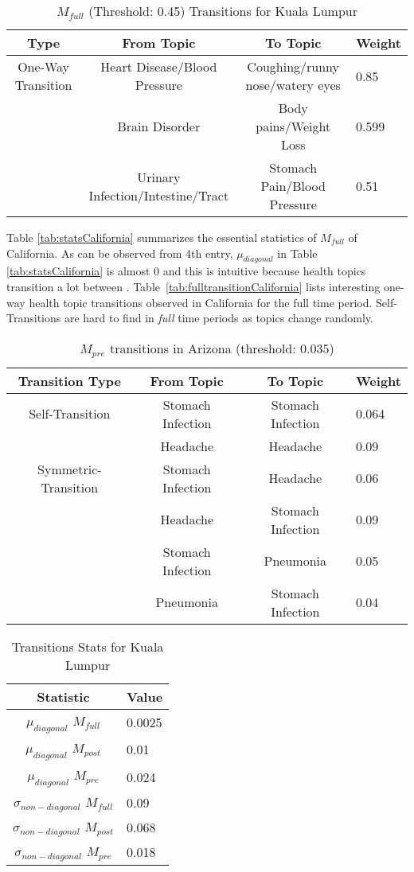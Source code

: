 \begin{table*}[t!]
\centering
\caption{$M_{full}$ (Threshold: 0.45) Transitions for Kuala Lumpur}
\label{tab:transitionKualaLumpur}
\begin{tabular}{|c|c|c|l|} \hline
Type &From Topic&To Topic&Weight\\ \hline
One-Way Transition& Heart Disease/Blood Pressure & Coughing/runny nose/watery eyes&0.85\\
 & Brain Disorder & Body pains/Weight Loss&0.599\\
 &Urinary Infection/Intestine/Tract & Stomach Pain/Blood Pressure&0.51\\
\hline\end{tabular}
\end{table*}
Table \ref{tab:statsCalifornia} summarizes the essential statistics 
of \textit{$M_{full}$} of California. As can be observed 
from 4th entry, $\mu_{diagonal}$ in Table \ref{tab:statsCalifornia} 
is almost 0 and this is intuitive because health topics transition a lot 
between \changes. Table~\ref{tab:fulltransitionCalifornia} lists 
interesting one-way health topic transitions observed in California for the full time period. Self-Transitions are hard to find
in \textit{full} time periods as topics change randomly. 
\begin{table*}[t!]
\centering
\caption{$M_{pre}$ transitions in Arizona (threshold: $0.035$)}
\label{tab:fulltransitionArizona}
\begin{tabular}{|c|c|c|l|} \hline
Transition Type & From Topic&To Topic&Weight\\ \hline
Self-Transition & Stomach Infection & Stomach Infection& 0.064\\ 
  &Headache &Headache& 0.09\\ \hline
Symmetric-Transition & Stomach Infection & Headache & 0.06\\ 
& Headache & Stomach Infection & 0.09\\
 & Stomach Infection & Pneumonia & 0.05\\ 
& Pneumonia & Stomach Infection & 0.04\\ 
 \hline\end{tabular}
\end{table*}	
\begin{table}[b!]
\centering
\caption{Transitions Stats for Kuala
Lumpur}
\label{tab:transitionStatsKualaLumpur}
\begin{tabular}{|c|l|} \hline
Statistic & Value \\ \hline
$\mu_{diagonal}$  $M_{full}$ &0.0025\\ \hline
$\mu_{diagonal}$ $M_{post}$ & 0.01 \\ \hline
$\mu_{diagonal}$  $M_{pre}$ &  0.024\\ \hline
$\sigma_{non-diagonal}$ $M_{full}$ & 0.09 \\ \hline
$\sigma_{non-diagonal}$ $M_{post}$& 0.068\\ \hline
$\sigma_{non-diagonal}$ $M_{pre}$& 0.018\\
 \hline\end{tabular}
\end{table}
